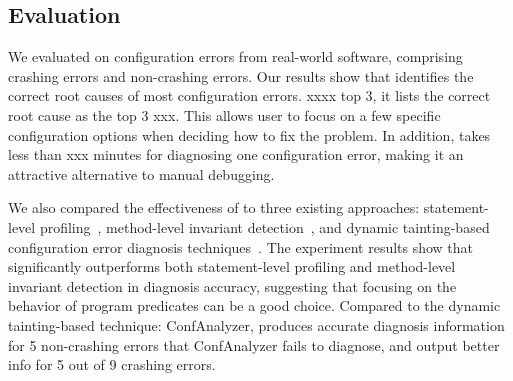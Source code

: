 
 









\subsection{Evaluation}

We evaluated \ourtool on \errors configuration errors
from \subjectnum real-world software, comprising
\crash crashing errors and \noncrash non-crashing errors.
Our results show that \ourtool identifies the correct
root causes of most configuration errors. xxxx top 3,
it lists the correct root cause as the top 3 xxx.
This allows \ourtool user to focus on a few specific configuration
options when deciding how to fix the problem. 
In addition, \ourtool takes less than xxx minutes for diagnosing
one configuration error, making it an attractive alternative
to manual debugging.

We also compared the effectiveness of \ourtool to
three existing approaches: statement-level profiling~\cite{Jones:2002}, method-level
invariant detection~\cite{Ernst:1999}, and dynamic tainting-based configuration
error diagnosis techniques~\cite{Rabkin:2011:PPC}. The experiment results show that
\ourtool significantly outperforms both statement-level profiling
and method-level invariant detection in diagnosis accuracy, suggesting
that focusing on the behavior of program predicates can be a
good choice. Compared to the dynamic tainting-based technique: ConfAnalyzer, \ourtool
produces accurate diagnosis information for 5 non-crashing errors that
ConfAnalyzer fails to diagnose, and output better info for 5 out of 9
crashing errors. 

